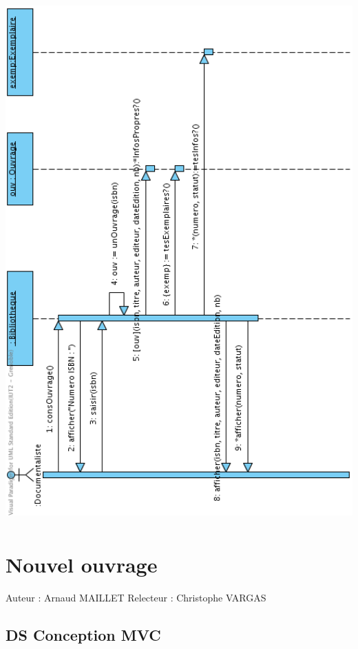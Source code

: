 \documentclass[a4paper,10pt]{report}
\begin{document}
\bigskip
\includegraphics[height=200mm]{ConsOuvNormal.png}
\newpage


\section*{Nouvel ouvrage}

Auteur : Arnaud MAILLET
Relecteur : Christophe VARGAS

\subsection*{DS Conception MVC}
\end{document}
